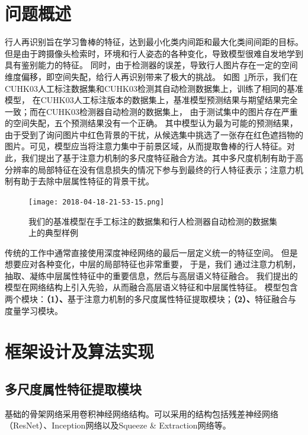 \section{问题概述}

行人再识别旨在学习鲁棒的特征，达到最小化类内间距和最大化类间间距的目标。
但是由于跨摄像头检索时，环境和行人姿态的各种变化，导致模型很难自发地学到具有鉴别能力的特征。
同时，由于检测器的误差，导致行人图片存在一定的空间维度偏移，即空间失配，给行人再识别带来了极大的挑战。
如图~\ref{fig:label2det}所示，我们在CUHK03人工标注数据集和CUHK03检测其自动检测数据集上，训练了相同的基准模型，
在CUHK03人工标注版本的数据集上，基准模型预测结果与期望结果完全一致；而在CUHK03检测器自动检测的数据集上，
由于测试集中的图片存在严重的空间失配，五个预测结果没有一个正确。
其中模型认为最为可能的预测结果，由于受到了询问图片中红色背景的干扰，从候选集中挑选了一张存在红色遮挡物的图片。可见，模型应当将注意力集中于前景区域，从而提取鲁棒的行人特征。对此，我们提出了基于注意力机制的多尺度特征融合方法。其中多尺度机制有助于高分辨率的局部特征在没有信息损失的情况下参与到最终的行人特征表示；注意力机制有助于去除中层属性特征的背景干扰。

\begin{figure}
	\centering
	\texttt{[image: 2018-04-18-21-53-15.png]}
	\caption{我们的基准模型在手工标注的数据集和行人检测器自动检测的数据集上的典型样例} \label{fig:label2det}
\end{figure}

传统的工作中通常直接使用深度神经网络的最后一层定义统一的特征空间。
但是想要应对各种变化，中层的局部特征也非常重要\cite{yu2017devil}，
于是，我们 
通过注意力机制，抽取、凝练中层属性特征中的重要信息，然后与高层语义特征融合。
我们提出的模型在网络结构上引入先验，从而融合高层语义特征和中层属性特征。
模型包含两个模块：\textbf{（1）、}基于注意力机制的多尺度属性特征提取模块；\textbf{（2）、}特征融合与度量学习模块。

\section{框架设计及算法实现}

\subsection{多尺度属性特征提取模块}

基础的骨架网络采用卷积神经网络结构。可以采用的结构包括残差神经网络（ResNet）\cite{he2016identity}、Inception网络\cite{szegedy2015going}以及Squeeze \& Extraction网络\cite{hu2017senet}等。

